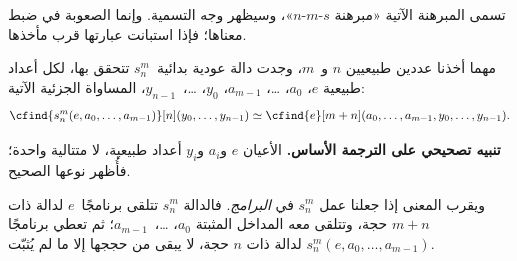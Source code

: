 \documentclass[../../../include/open-logic-section]{subfiles}
\begin{document}

\begin{explain}
تسمى المبرهنة الآتية «مبرهنة $s$-$m$-$n$»، وسيظهر وجه
التسمية. وإنما الصعوبة في ضبط معناها؛ فإذا استبانت عبارتها
قرب مأخذها.
\end{explain}

\begin{thm}
  مهما أخذنا عددين طبيعيين $n$ و~$m$، وجدت دالة عودية بدائية~$s^m_n$
  تتحقق بها، لكل أعداد طبيعية $e$، $a_0$، …، $a_{m-1}$، $y_0$،
  …،~$y_{n-1}$، المساواة الجزئية الآتية:
  \[
  \cfind{s^m_n(e, a_0, \dots, a_{m-1})}[n](y_0, \dots, y_{n-1}) \simeq
  \cfind{e}[m+n](a_0, \dots, a_{m-1}, y_0, \dots, y_{n-1}).
\]
\end{thm}

\textbf{تنبيه تصحيحي على الترجمة الأساس.} الأعيان $e$ و$a_i$ و$y_i$
أعداد طبيعية، لا متتالية واحدة؛ فأُظهر نوعها الصحيح.

\begin{explain}
ويقرب المعنى إذا جعلنا عمل $s^m_n$ في \emph{البرامج}. فالدالة $s^m_n$
تتلقى برنامجًا~$e$ لدالة ذات $m+n$ حجة، وتتلقى معه المداخل المثبتة $a_0$،
…،~$a_{m-1}$؛ ثم تعطي برنامجًا
$s^m_n(e,a_0,\dots,a_{m-1})$ لدالة ذات $n$ حجة، لا يبقى من حججها إلا ما لم يُثبّت.
\end{explain}
\end{document}
